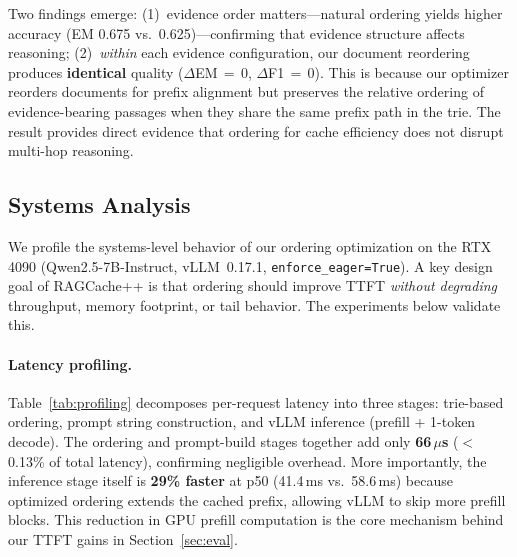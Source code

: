 \documentclass{article}
\begin{document}
Two findings emerge: (1)~evidence order matters---natural ordering yields higher accuracy (EM 0.675 vs.\ 0.625)---confirming that evidence structure affects reasoning; (2)~\emph{within} each evidence configuration, our document reordering produces \textbf{identical} quality ($\Delta$EM\,$=$\,0, $\Delta$F1\,$=$\,0). This is because our optimizer reorders documents for prefix alignment but preserves the relative ordering of evidence-bearing passages when they share the same prefix path in the trie. The result provides direct evidence that ordering for cache efficiency does not disrupt multi-hop reasoning.

\subsection{Systems Analysis}
\label{sec:systems}

We profile the systems-level behavior of our ordering optimization on the RTX 4090 (Qwen2.5-7B-Instruct, vLLM~0.17.1, \texttt{enforce\_eager=True}). A key design goal of RAGCache++ is that ordering should improve TTFT \emph{without degrading} throughput, memory footprint, or tail behavior. The experiments below validate this.

\paragraph{Latency profiling.}
Table~\ref{tab:profiling} decomposes per-request latency into three stages: trie-based ordering, prompt string construction, and vLLM inference (prefill + 1-token decode). The ordering and prompt-build stages together add only \textbf{66\,$\mu$s} ($<$0.13\% of total latency), confirming negligible overhead. More importantly, the inference stage itself is \textbf{29\% faster} at p50 (41.4\,ms vs.\ 58.6\,ms) because optimized ordering extends the cached prefix, allowing vLLM to skip more prefill blocks. This reduction in GPU prefill computation is the core mechanism behind our TTFT gains in Section~\ref{sec:eval}.

\begin{table}[t]
\caption{Per-request latency breakdown (RTX 4090, 195 post-warmup queries). Ordering adds 66\,$\mu$s while reducing inference p50 by 29\%.}
\label{tab:profiling}
\centering
\small
{}
\vspace{-0.5em}
\end{table}
\end{document}
